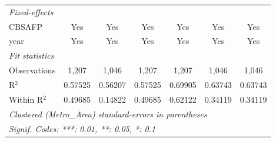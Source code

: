 \documentclass[A4paper,12pt]{article}
\begin{document}
\begin{appendices}
\begin{table}[ht]
{\begin{tabular}{lcccccc}
   \midrule
   \emph{Fixed-effects}\\
   CBSAFP                                          & Yes            & Yes            & Yes            & Yes            & Yes            & Yes\\  
   year                                            & Yes            & Yes            & Yes            & Yes            & Yes            & Yes\\  
   \midrule
   \emph{Fit statistics}\\
   Observations                                    & 1,207          & 1,046          & 1,207          & 1,207          & 1,046          & 1,046\\  
   R$^2$                                           & 0.57525        & 0.56207        & 0.57525        & 0.69905        & 0.63743        & 0.63743\\  
   Within R$^2$                                    & 0.49685        & 0.14822        & 0.49685        & 0.62122        & 0.34119        & 0.34119\\  
   \midrule \midrule
   \multicolumn{7}{l}{\emph{Clustered (Metro_Area) standard-errors in parentheses}}\\
   \multicolumn{7}{l}{\emph{Signif. Codes: ***: 0.01, **: 0.05, *: 0.1}}\\
\end{tabular}}
\end{table}

\end{appendices}
\end{document}
